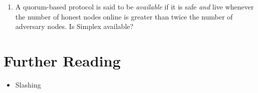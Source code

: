 \begin{problems}
\begin{enumerate}
\begin{enumerate}
                        rate of the longest notarized chain.
                \item Compute a lower bound on the expected growth rate of
                        the finalized chain. (Your lower bound does not need to be tight.
                        However if the lower bound is not tight, it must be positive.)
                \item Is the protocol safe? Is the protocol live?
                \end{enumerate}
            \item A quorum-based protocol is said to be {\em available} if it
                is safe \emph{and} live whenever the number of honest nodes online is
                greater than twice the number of adversary nodes. Is Simplex available?
        \end{enumerate}

\end{problems}

\section*{Further Reading}

{\color{red}
\begin{itemize}
\item Slashing
\end{itemize}
}

